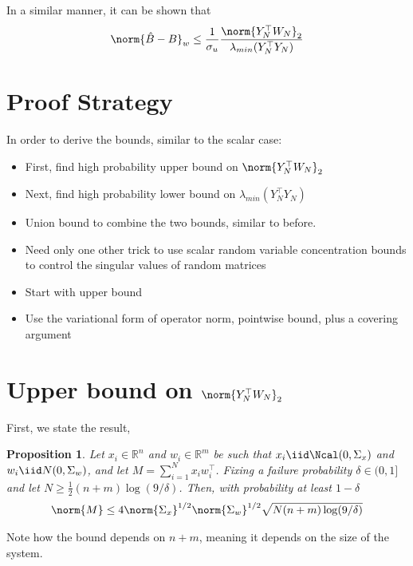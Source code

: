 \documentclass{article}[12pt]
\newtheorem{prop}{Proposition}
\def \R{\mathbb R}
\begin{document}
In a similar manner, it can be shown that
\begin{align*}
\norm{\hat{B}-B}_w \leq \frac{1}{\sigma_u}
\frac{\norm{Y_N^\top W_N}_2}{\lambda_{min}(Y_N^\top Y_N)}
\end{align*}

\section{Proof Strategy}
In order to derive the bounds, similar to the scalar case:
\begin{itemize}
	\item First, find high probability upper bound on $\norm{Y_N^\top W_N}_2$
	\item Next, find high probability lower bound on $\lambda_{min}(Y_N^\top Y_N)$
	\item Union bound to combine the two bounds, similar to before. 
	\item Need only one other trick to use scalar random variable concentration bounds to control the singular values of random matrices
	\item Start with upper bound
	\item Use the variational form of operator norm, pointwise bound, plus a covering argument
\end{itemize} 

\section{Upper bound on $\norm{Y_N^\top W_N}_2$}
First, we state the result, 

\begin{prop}
	\label{prop:ub2}
Let $x_i \in \R^n$ and $w_i \in \R^m$ be such that $x_i \iid \Ncal(0, \Sigma_x)$ and $w_i \iid N(0, \Sigma_w)$, and let $M = \sum_{i=1}^{N} x_i w_i^\top$. Fixing a failure probability $\delta \in (0,1]$ and let $N \geq \frac{1}{2} (n+ m)\log(9/\delta)$. Then, with probability at least $1-\delta$
\begin{align*}
\norm{M} \leq 4 \norm{\Sigma_x}^{1/2}\norm{\Sigma_w}^{1/2}
\sqrt{N(n+m)\log(9/\delta)}
\end{align*}
\end{prop}
Note how the bound depends on $n+m$, meaning it depends on the size of the system.  
\end{document}
